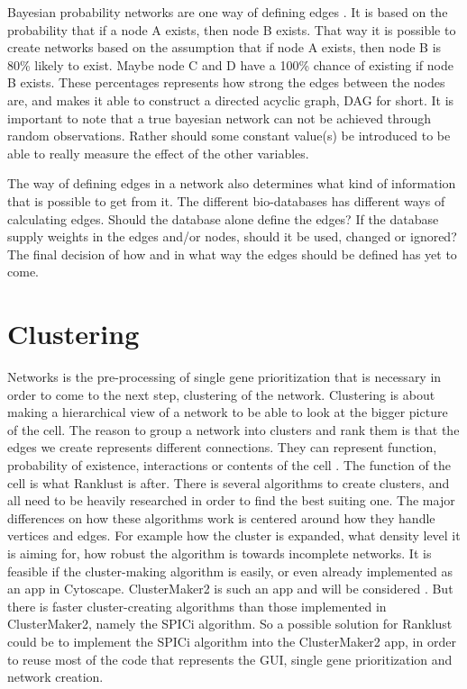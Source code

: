 \documentclass[UKenglish,11pt,a4paper]{article}
\begin{document}
Bayesian probability networks are one way of defining edges \cite{bayesiannetworks}. It is based on the probability that
if a node A exists, then node B exists. That way it is possible to create networks based on the assumption that if node
A exists, then node B is 80\% likely to exist. Maybe node C and D have a 100\% chance of existing if node B exists.
These percentages represents how strong the edges between the nodes are, and makes it able to construct a directed
acyclic graph, DAG for short. It is important to note that a true bayesian network can not be achieved through random 
observations. Rather should some constant value(s) be introduced to be able to really measure the effect of the other
variables.

The way of defining edges in a network also determines what kind of information that is possible to get from it. The
different bio-databases has different ways of calculating edges. Should the database alone define the edges? If the
database supply weights in the edges and/or nodes, should it be used, changed or ignored? The final decision of how and
in what way the edges should be defined has yet to come. 
\section{Clustering}
Networks is the pre-processing of single gene prioritization that is necessary in order to come to the next step,
clustering of the network. Clustering is about making a hierarchical view of a network to be able to look at the bigger
picture of the cell. The reason to group a network into clusters and rank them is that the edges we create represents
different connections. They can represent function, probability of existence, interactions or contents of the cell
\cite{siri}. The function of the cell is what Ranklust is after. There is several algorithms to create clusters, and all
need to be heavily researched in order to find the best suiting one. The major differences on how these algorithms work
is centered around how they handle vertices and edges. For example how the cluster is expanded, what density level it is
aiming for, how robust the algorithm is towards incomplete networks. It is feasible if the cluster-making algorithm is
easily, or even already implemented as an app in Cytoscape. ClusterMaker2 is such an app and will be considered
\cite{cm2}. But there is faster cluster-creating algorithms than those implemented in ClusterMaker2, namely the SPICi
\cite{spici} algorithm. So a possible solution for Ranklust could be to implement the SPICi algorithm into the
ClusterMaker2 app, in order to reuse most of the code that represents the GUI, single gene prioritization and network
creation.
\end{document}
